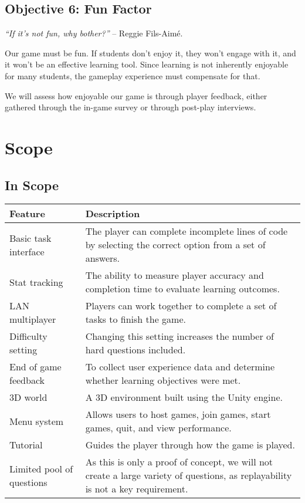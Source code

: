 \documentclass{article}
\begin{document}
\subsection*{Objective 6: Fun Factor}
\textit{“If it’s not fun, why bother?”} – Reggie Fils-Aimé.

Our game must be fun. If students don’t enjoy it, they won’t engage with it, and it won’t be an effective learning tool. Since learning is not inherently enjoyable for many students, the gameplay experience must compensate for that.

We will assess how enjoyable our game is through player feedback, either gathered through the in-game survey or through post-play interviews.

\section{Scope}
\subsection*{In Scope}

\begin{tabularx}{\textwidth}{|l|X|}
\hline
\textbf{Feature} & \textbf{Description} \\
\hline
Basic task interface & The player can complete incomplete lines of code by selecting the correct option from a set of answers.\\
\hline
Stat tracking & The ability to measure player accuracy and completion time to evaluate learning outcomes. \\
\hline
LAN multiplayer & Players can work together to complete a set of tasks to finish the game. \\
\hline
Difficulty setting & Changing this setting increases the number of hard questions included. \\
\hline
End of game feedback & To collect user experience data and determine whether learning objectives were met. \\
\hline
3D world & A 3D environment built using the Unity engine. \\
\hline
Menu system & Allows users to host games, join games, start games, quit, and view performance. \\
\hline
Tutorial & Guides the player through how the game is played. \\
\hline
Limited pool of questions & As this is only a proof of concept, we will not create a large variety of questions, as replayability is not a key requirement. \\
\hline
\end{tabularx}
\end{document}
